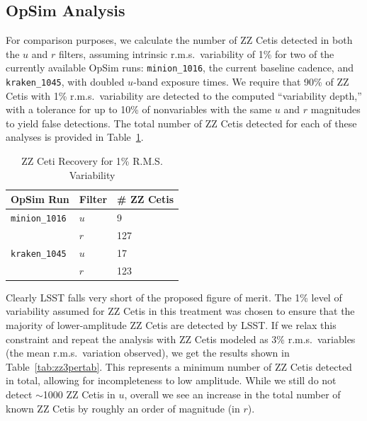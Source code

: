 
\subsection{OpSim Analysis}
\label{sec:\secname:analysis}

For comparison purposes, we calculate the number of ZZ Cetis detected in
both the $u$ and $r$ filters, assuming intrinsic r.m.s.\ variability of
1\% for two of the currently available OpSim runs: {\tt minion\_1016},
the current baseline cadence, and {\tt kraken\_1045}, with doubled
$u$-band exposure times. We require that 90\% of ZZ Cetis with 1\%
r.m.s.\  variability are detected to the computed ``variability depth,''
with a tolerance for up to 10\% of nonvariables with the same $u$ and
$r$ magnitudes to yield false detections.  The total number of ZZ Cetis
detected for each of these analyses is provided in
Table~\ref{tab:zz1pertab}.


\begin{table}[h]
\begin{center}
    \caption{ZZ Ceti Recovery for 1\% R.M.S. Variability}\label{tab:zz1pertab}
    \begin{tabular}{| l | l | l |}
    \hline
    OpSim Run & Filter & \# ZZ Cetis \\ \hline
     {\tt minion\_1016} & $u$ & 9  \\
      & $r$ & 127 \\ \hline
    {\tt kraken\_1045}  & $u$ & 17\\
    & $r$ & 123  \\ \hline
    \end{tabular}
\end{center}
\end{table}

Clearly LSST falls very short of the proposed figure of merit.  The 1\%
level of variability assumed for ZZ Cetis in this treatment was chosen
to ensure that the majority of lower-amplitude ZZ Cetis are detected by
LSST.  If we relax this constraint and repeat the analysis with ZZ Cetis
modeled as 3\% r.m.s.\ variables (the mean r.m.s.\ variation observed),
we get the results shown in Table~\ref{tab:zz3pertab}.  This represents
a minimum number of ZZ Cetis detected in total, allowing for
incompleteness to low amplitude.  While we still do not detect
$\sim$1000 ZZ Cetis in $u$, overall we see an increase in the total
number of known ZZ Cetis by roughly an order of magnitude (in $r$).


